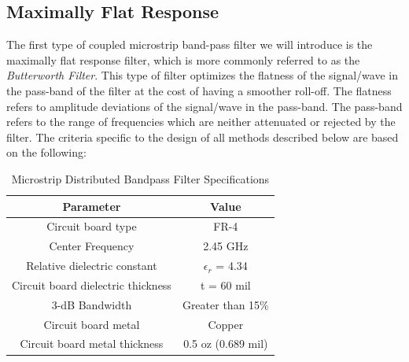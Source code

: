 \documentclass{article}
\begin{document}
\subsection{Maximally Flat Response}
The first type of coupled microstrip band-pass filter we will introduce is the maximally flat response filter, which is more commonly referred to as the \textit{Butterworth Filter}. This type of filter optimizes the flatness of the signal/wave in the pass-band of the filter at the cost of having a smoother roll-off. The flatness refers to amplitude deviations of the signal/wave in the pass-band. The pass-band refers to the range of frequencies which are neither attenuated or rejected by the filter. The criteria specific to the design of all methods described below are based on the following:
\begin{table}[h!]
\centering
\begin{tabular}{|c | c|} 
 \hline
 \textbf{Parameter} & \textbf{Value} \\ [0.5ex] 
 \hline
 Circuit board type & FR-4 \\ 
 \hline
 Center Frequency & 2.45 GHz \\
 \hline
 Relative dielectric constant & $\epsilon_r$ = 4.34 \\
 \hline
 Circuit board dielectric thickness & t = 60 mil \\
 \hline
 3-dB Bandwidth & Greater than 15\% \\
 \hline
 Circuit board metal & Copper \\
 \hline
 Circuit board metal thickness & 0.5 oz (0.689 mil) \\ [1ex]
 \hline
\end{tabular}
\caption{Microstrip Distributed Bandpass Filter Specifications}
\label{table:1}
\end{table}
\end{document}
